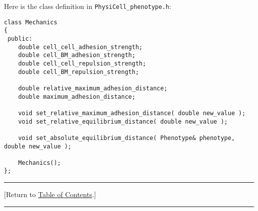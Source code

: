\documentclass[12pt]{article}
\renewcommand{\v}{\verb}
\newcommand{\TOClink}{\begin{center}\hrule\vskip-5pt\phantom{.}\hfill[Return to \hyperlink{TOC}{Table of Contents}.]\hfill\phantom{.}\vskip3pt\hrule\end{center}}
\begin{document}
Here is the class definition in \v|PhysiCell_phenotype.h|:
\begin{verbatim}
class Mechanics
{
 public:
    double cell_cell_adhesion_strength; 
    double cell_BM_adhesion_strength;
    double cell_cell_repulsion_strength;
    double cell_BM_repulsion_strength; 
    
    double relative_maximum_adhesion_distance; 
    double maximum_adhesion_distance;
	
    void set_relative_maximum_adhesion_distance( double new_value );  
    void set_relative_equilibrium_distance( double new_value );  
	
    void set_absolute_equilibrium_distance( Phenotype& phenotype, double new_value );  
    
    Mechanics();      
};

\end{verbatim}
\TOClink
\end{document}
